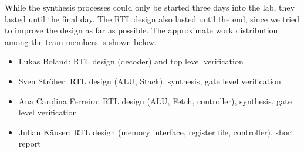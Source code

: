 While the synthesis processes could only be started three days into the lab, they lasted until the final day. The RTL design also lasted until the end, since we tried to improve the design as far as possible. The approximate work distribution among the team members is shown below.

\begin{itemize}
\item Lukas Boland: RTL design (decoder) and top level verification
\item Sven Str\"oher: RTL design (ALU, Stack), synthesis, gate level verification
\item Ana Carolina Ferreira: RTL design (ALU, Fetch, controller), synthesis, gate level verification
\item Julian K\"auser: RTL design (memory interface, register file, controller), short report
\end{itemize}



